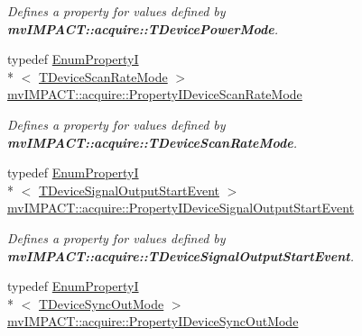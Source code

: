 \begin{DoxyCompactItemize}
\begin{DoxyCompactList}\small\item\em Defines a property for values defined by {\bfseries mv\+I\+M\+P\+A\+C\+T\+::acquire\+::\+T\+Device\+Power\+Mode}. \end{DoxyCompactList}\item 
\hypertarget{group___device_specific_interface_gaec7b599c0645e2ee61b6be26320ae04e}{typedef \hyperlink{classmv_i_m_p_a_c_t_1_1acquire_1_1_enum_property_i}{Enum\+Property\+I}\\*
$<$ \hyperlink{group___device_specific_interface_ga7bca9cd5c970d423f2c1a2a065f3018c}{T\+Device\+Scan\+Rate\+Mode} $>$ \hyperlink{group___device_specific_interface_gaec7b599c0645e2ee61b6be26320ae04e}{mv\+I\+M\+P\+A\+C\+T\+::acquire\+::\+Property\+I\+Device\+Scan\+Rate\+Mode}}\label{group___device_specific_interface_gaec7b599c0645e2ee61b6be26320ae04e}

\begin{DoxyCompactList}\small\item\em Defines a property for values defined by {\bfseries mv\+I\+M\+P\+A\+C\+T\+::acquire\+::\+T\+Device\+Scan\+Rate\+Mode}. \end{DoxyCompactList}\item 
\hypertarget{group___device_specific_interface_ga63bede647f87c0203f196d9002ffac9e}{typedef \hyperlink{classmv_i_m_p_a_c_t_1_1acquire_1_1_enum_property_i}{Enum\+Property\+I}\\*
$<$ \hyperlink{group___device_specific_interface_ga83333b94d7a6a3f1ba96189b4e71fac0}{T\+Device\+Signal\+Output\+Start\+Event} $>$ \hyperlink{group___device_specific_interface_ga63bede647f87c0203f196d9002ffac9e}{mv\+I\+M\+P\+A\+C\+T\+::acquire\+::\+Property\+I\+Device\+Signal\+Output\+Start\+Event}}\label{group___device_specific_interface_ga63bede647f87c0203f196d9002ffac9e}

\begin{DoxyCompactList}\small\item\em Defines a property for values defined by {\bfseries mv\+I\+M\+P\+A\+C\+T\+::acquire\+::\+T\+Device\+Signal\+Output\+Start\+Event}. \end{DoxyCompactList}\item 
\hypertarget{group___device_specific_interface_ga482ce750b5e60bc66a44cd2640ae757e}{typedef \hyperlink{classmv_i_m_p_a_c_t_1_1acquire_1_1_enum_property_i}{Enum\+Property\+I}\\*
$<$ \hyperlink{group___device_specific_interface_gad576d8b9fd814fca5847184679d793b7}{T\+Device\+Sync\+Out\+Mode} $>$ \hyperlink{group___device_specific_interface_ga482ce750b5e60bc66a44cd2640ae757e}{mv\+I\+M\+P\+A\+C\+T\+::acquire\+::\+Property\+I\+Device\+Sync\+Out\+Mode}}\label{group___device_specific_interface_ga482ce750b5e60bc66a44cd2640ae757e}


\end{DoxyCompactItemize}
